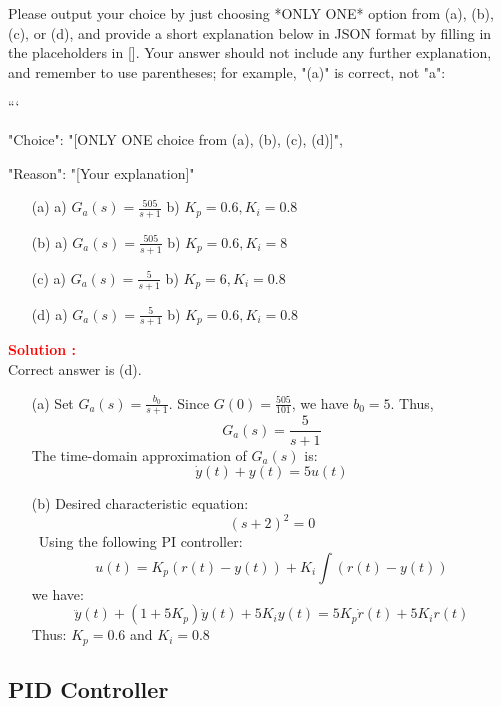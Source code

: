 \documentclass[12pt]{article}
\begin{document}
 Please output your choice by just choosing *ONLY ONE* option from (a), (b), (c), or (d), and provide a short explanation below in JSON format by filling in the placeholders in []. Your answer should not include any further explanation, and remember to use parentheses; for example, "(a)" is correct, not "a":

```
{

"Choice": "[ONLY ONE choice from (a), (b), (c), (d)]",

"Reason": "[Your explanation]"

}

\begin{itemize}
    \item[(a)] a) \(G_a(s) = \frac{505}{s+1}\) b) \(K_p = 0.6, K_i = 0.8\)
    \item[(b)] a) \(G_a(s) = \frac{505}{s+1}\) b) \(K_p = 0.6, K_i = 8\)
    \item[(c)] a) \(G_a(s) = \frac{5}{s+1}\) b) \(K_p = 6, K_i = 0.8\)
    \item[(d)] a) \(G_a(s) = \frac{5}{s+1}\) b) \(K_p = 0.6, K_i = 0.8\)
\end{itemize}

\textbf{\textcolor{red}{Solution :}} \\
Correct answer is (d).\\
\begin{itemize}
    \item[(a)] Set \(G_a(s) = \frac{b_0}{s+1}\). Since \(G(0) = \frac{505}{101}\), we have \(b_0 = 5\). Thus,
\begin{equation}
    G_a(s) = \frac{5}{s+1}
\end{equation}
The time-domain approximation of \(G_a(s)\) is:
\begin{equation}
    \dot{y}(t) + y(t) = 5 u(t)
\end{equation}
\item[(b)]  Desired characteristic equation:
    \[ (s+2)^2 = 0\]\
    Using the following PI controller:
    \[u(t) = K_p (r(t)-y(t)) + K_i \int (r(t)-y(t))\]
    we have:
    \[\ddot{y}(t) + (1+5K_p)\dot{y}(t) + 5K_i y(t) = 5K_p \dot{r}(t) + 5K_i r(t)\]
    Thus:
    \(K_p = 0.6\) and \(K_i = 0.8\)
\end{itemize}
\clearpage

\subsection{PID Controller}
\end{document}
